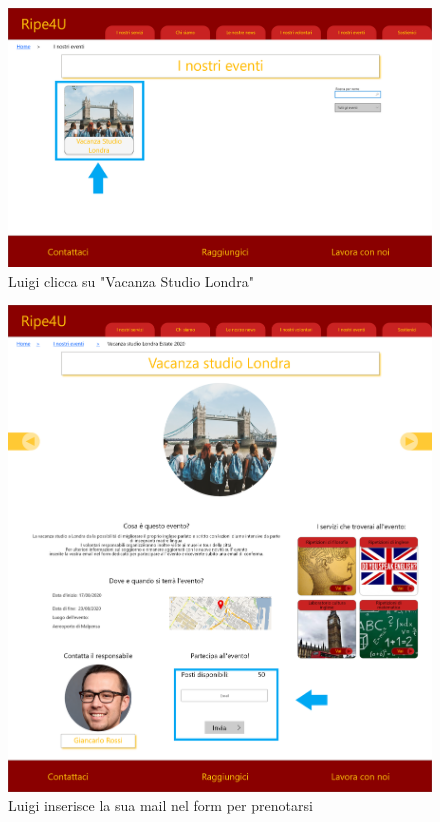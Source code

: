     \begin{figure}[H]
        \centering
        \includegraphics[scale=0.25]{resources/images/scenario2-3.png}
        \caption{Luigi clicca su "Vacanza Studio Londra"}
    \end{figure}
    \begin{figure}[H]
        \centering
        \includegraphics[scale=0.25]{resources/images/scenario2-4.png}
        \caption{Luigi inserisce la sua mail nel form per prenotarsi}
    \end{figure}
    \newpage
